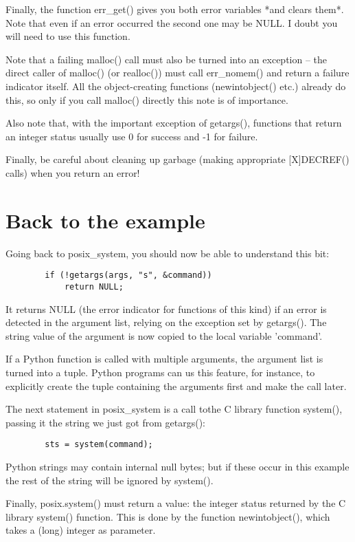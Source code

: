 Finally, the function err_get() gives you both error variables
*and clears them*.  Note that even if an error occurred the second one
may be NULL.  I doubt you will need to use this function.

Note that a failing malloc() call must also be turned into an
exception -- the direct caller of malloc() (or realloc()) must call
err_nomem() and return a failure indicator itself.  All the
object-creating functions (newintobject() etc.) already do this, so
only if you call malloc() directly this note is of importance.

Also note that, with the important exception of getargs(), functions
that return an integer status usually use 0 for success and -1 for
failure.

Finally, be careful about cleaning up garbage (making appropriate
[X]DECREF() calls) when you return an error!


\section{Back to the example}

Going back to posix_system, you should now be able to understand this
bit:

\begin{verbatim}
        if (!getargs(args, "s", &command))
            return NULL;
\end{verbatim}

It returns NULL (the error indicator for functions of this kind) if an
error is detected in the argument list, relying on the exception set
by getargs().  The string value of the argument is now copied to the
local variable 'command'.

If a Python function is called with multiple arguments, the argument
list is turned into a tuple.  Python programs can us this feature, for
instance, to explicitly create the tuple containing the arguments
first and make the call later.

The next statement in posix_system is a call tothe C library function
system(), passing it the string we just got from getargs():

\begin{verbatim}
        sts = system(command);
\end{verbatim}

Python strings may contain internal null bytes; but if these occur in
this example the rest of the string will be ignored by system().

Finally, posix.system() must return a value: the integer status
returned by the C library system() function.  This is done by the
function newintobject(), which takes a (long) integer as parameter.


